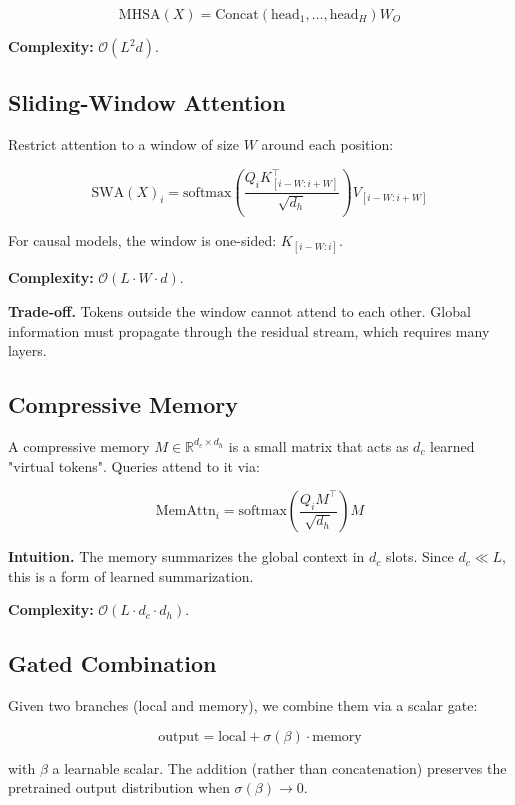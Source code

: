 \[
\text{MHSA}(X) = \text{Concat}(\text{head}_1, \dots, \text{head}_H) W_O
\tag{3.2}
\]

\textbf{Complexity:} $\mathcal{O}(L^2 d)$.

\subsection{Sliding-Window Attention}

Restrict attention to a window of size $W$ around each position:

\[
\text{SWA}(X)_i = \text{softmax}\!\left(\frac{Q_i K_{[i-W:i+W]}^\top}{\sqrt{d_h}}\right) V_{[i-W:i+W]}
\tag{3.3}
\]

For causal models, the window is one-sided: $K_{[i-W:i]}$.

\textbf{Complexity:} $\mathcal{O}(L \cdot W \cdot d)$.

\textbf{Trade-off.} Tokens outside the window cannot attend to each other. 
Global information must propagate through the residual stream, which 
requires many layers.

\subsection{Compressive Memory}

A compressive memory $M \in \mathbb{R}^{d_c \times d_h}$ is a small matrix 
that acts as $d_c$ learned "virtual tokens". Queries attend to it via:

\[
\text{MemAttn}_i = \text{softmax}\!\left(\frac{Q_i M^\top}{\sqrt{d_h}}\right) M
\tag{3.4}
\]

\textbf{Intuition.} The memory summarizes the global context in $d_c$ slots. 
Since $d_c \ll L$, this is a form of learned summarization.

\textbf{Complexity:} $\mathcal{O}(L \cdot d_c \cdot d_h)$.

\subsection{Gated Combination}

Given two branches (local and memory), we combine them via a scalar gate:

\[
\text{output} = \text{local} + \sigma(\beta) \cdot \text{memory}
\tag{3.5}
\]

with $\beta$ a learnable scalar. The addition (rather than concatenation) 
preserves the pretrained output distribution when $\sigma(\beta) \to 0$.

